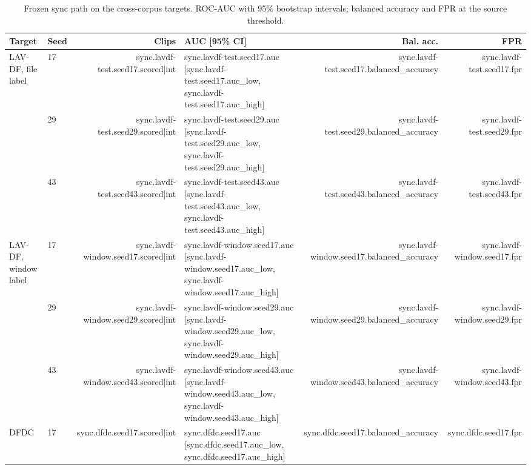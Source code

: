 \begin{table}[ht]
    \centering
    \small
    \caption{Frozen sync path on the cross-corpus targets. ROC-AUC with 95\% bootstrap intervals; balanced accuracy and FPR at the source threshold.}
    \label{tab:cross-corpus}
    \begin{tabular}{l l r l r r}
        \toprule
        \textbf{Target} & \textbf{Seed} & \textbf{Clips} & \textbf{AUC [95\% CI]} & \textbf{Bal. acc.} & \textbf{FPR} \\
        \midrule
        LAV-DF, file label & 17 & {{sync.lavdf-test.seed17.scored|int}} & {{sync.lavdf-test.seed17.auc}} [{{sync.lavdf-test.seed17.auc_low}}, {{sync.lavdf-test.seed17.auc_high}}] & {{sync.lavdf-test.seed17.balanced_accuracy}} & {{sync.lavdf-test.seed17.fpr}} \\
                    & 29 & {{sync.lavdf-test.seed29.scored|int}} & {{sync.lavdf-test.seed29.auc}} [{{sync.lavdf-test.seed29.auc_low}}, {{sync.lavdf-test.seed29.auc_high}}] & {{sync.lavdf-test.seed29.balanced_accuracy}} & {{sync.lavdf-test.seed29.fpr}} \\
                    & 43 & {{sync.lavdf-test.seed43.scored|int}} & {{sync.lavdf-test.seed43.auc}} [{{sync.lavdf-test.seed43.auc_low}}, {{sync.lavdf-test.seed43.auc_high}}] & {{sync.lavdf-test.seed43.balanced_accuracy}} & {{sync.lavdf-test.seed43.fpr}} \\
        \midrule
        LAV-DF, window label & 17 & {{sync.lavdf-window.seed17.scored|int}} & {{sync.lavdf-window.seed17.auc}} [{{sync.lavdf-window.seed17.auc_low}}, {{sync.lavdf-window.seed17.auc_high}}] & {{sync.lavdf-window.seed17.balanced_accuracy}} & {{sync.lavdf-window.seed17.fpr}} \\
                    & 29 & {{sync.lavdf-window.seed29.scored|int}} & {{sync.lavdf-window.seed29.auc}} [{{sync.lavdf-window.seed29.auc_low}}, {{sync.lavdf-window.seed29.auc_high}}] & {{sync.lavdf-window.seed29.balanced_accuracy}} & {{sync.lavdf-window.seed29.fpr}} \\
                    & 43 & {{sync.lavdf-window.seed43.scored|int}} & {{sync.lavdf-window.seed43.auc}} [{{sync.lavdf-window.seed43.auc_low}}, {{sync.lavdf-window.seed43.auc_high}}] & {{sync.lavdf-window.seed43.balanced_accuracy}} & {{sync.lavdf-window.seed43.fpr}} \\
        \midrule
        DFDC & 17 & {{sync.dfdc.seed17.scored|int}} & {{sync.dfdc.seed17.auc}} [{{sync.dfdc.seed17.auc_low}}, {{sync.dfdc.seed17.auc_high}}] & {{sync.dfdc.seed17.balanced_accuracy}} & {{sync.dfdc.seed17.fpr}} \\

\end{tabular}
\end{table}
